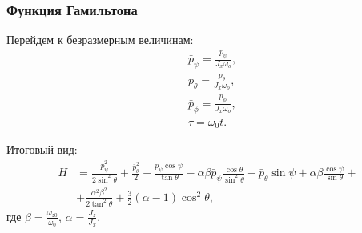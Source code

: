 \documentclass[10pt,pdf,hyperref={unicode}]{beamer}
\begin{document}
\begin{frame}
\frametitle{Функция Гамильтона}
	Перейдем к безразмерным величинам:
	\begin{equation*}
		\begin {split}
			&\bar{p}_\psi = \frac{p_\psi}{J_x \omega_o}, \\
			&\bar{p}_\theta = \frac{p_\theta}{J_x \omega_o}, \\
			&\bar{p}_\phi = \frac{p_\phi}{J_x \omega_o}, \\
			&\tau = \omega_0 t.
		\end{split}
	\end{equation*}
	
	Итоговый вид:
	\begin{equation*}
		\begin{split}
			H &= \frac{\bar{p}_\psi^2}{2 \sin^2 \theta} + \frac{\bar{p}_\theta^2}{2} - \frac{\bar{p}_\psi \cos \psi}{\tan \theta} - \alpha \beta \bar{p}_\psi\frac{\cos \theta}{\sin^2 \theta} - \bar{p}_\theta \sin \psi + \alpha \beta \frac{\cos\psi}{\sin \theta} +\\
			&+ \frac{\alpha^2 \beta^2}{2 \tan^2 \theta} + \frac{3}{2} (\alpha - 1) \cos^2 \theta,
		\end{split}
	\end{equation*}
	где $\beta = \frac{\omega_{z0}}{\omega_0}$, $\alpha = \frac{J_z}{J_x}$.
\end{frame}
\end{document}
